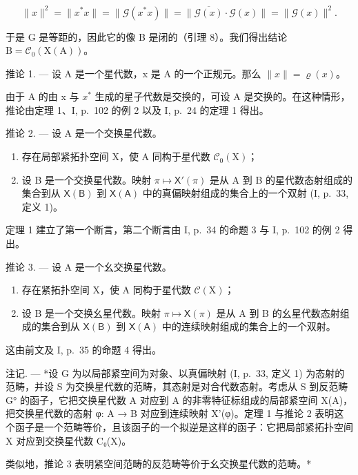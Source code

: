 \[
\| x \| ^ {2} = \| x ^ {*} x \| = \| \mathcal {G} (x ^ {*} x) \| = \| \overline {{\mathcal {G} (x)}} \cdot \mathcal {G} (x) \| = \| \mathcal {G} (x) \| ^ {2}.
\]

于是 G 是等距的，因此它的像 B 是闭的（引理 8）。我们得出结论 \(\mathrm{B} = \mathcal{C}_{0}(\mathrm{X}(\mathrm{A}))\)。

推论 1. --- 设 A 是一个星代数，x 是 A 的一个正规元。那么 \(\|x\| = \varrho(x)\)。

由于 A 的由 x 与 \(x^{*}\) 生成的星子代数是交换的，可设 A 是交换的。在这种情形，推论由定理 1、I, p.~102 的例 2 以及 I, p.~24 的定理 1 得出。

推论 2. --- 设 A 是一个交换星代数。

\begin{enumerate}
\def\labelenumi{\alph{enumi})}
\item
  存在局部紧拓扑空间 X，使 A 同构于星代数 \(\mathcal{C}_{0}(\mathrm{X})\)；
\item
  设 B 是一个交换星代数。映射 \(\pi \mapsto \mathsf{X}'(\pi)\) 是从 A 到 B 的星代数态射组成的集合到从 \(\mathsf{X}(\mathsf{B})\) 到 \(\mathsf{X}(\mathsf{A})\) 中的真偏映射组成的集合上的一个双射 (I, p.~33, 定义 1)。
\end{enumerate}

定理 1 建立了第一个断言，第二个断言由 I, p.~34 的命题 3 与 I, p.~102 的例 2 得出。

推论 3. --- 设 A 是一个幺交换星代数。

\begin{enumerate}
\def\labelenumi{\alph{enumi})}
\item
  存在紧拓扑空间 X，使 A 同构于星代数 \(\mathcal{C}(\mathrm{X})\)；
\item
  设 B 是一个交换幺星代数。映射 \(\pi \mapsto \mathsf{X}(\pi)\) 是从 A 到 B 的幺星代数态射组成的集合到从 \(\mathsf{X}(\mathsf{B})\) 到 \(\mathsf{X}(\mathsf{A})\) 中的连续映射组成的集合上的一个双射。
\end{enumerate}

这由前文及 I, p.~35 的命题 4 得出。

注记. --- *设 G 为以局部紧空间为对象、以真偏映射 (I, p.~33, 定义 1) 为态射的范畴，并设 S 为交换星代数的范畴，其态射是对合代数态射。考虑从 S 到反范畴 G° 的函子，它把交换星代数 A 对应到 A 的非零特征标组成的局部紧空间 X(A)，把交换星代数的态射 φ: A → B 对应到连续映射 X'(φ)。定理 1 与推论 2 表明这个函子是一个范畴等价，且该函子的一个拟逆是这样的函子：它把局部紧拓扑空间 X 对应到交换星代数 C₀(X)。

类似地，推论 3 表明紧空间范畴的反范畴等价于幺交换星代数的范畴。*

